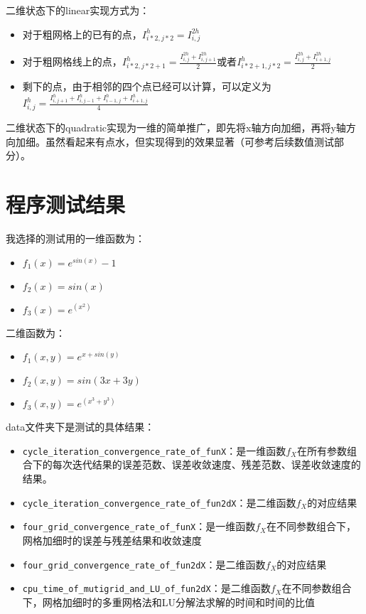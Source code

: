 \documentclass[12]{article}%
\begin{document}
二维状态下的linear实现方式为：
\begin{itemize}
    \item 对于粗网格上的已有的点，$I^h_{i*2,j*2}=I^{2h}_{i,j}$
    \item 对于粗网格线上的点，$I^h_{i*2,j*2+1}=\frac{I^{2h}_{i,j}+I^{2h}_{i,j+1}}{2}$或者$I^h_{i*2+1,j*2}=\frac{I^{2h}_{i,j}+I^{2h}_{i+1,j}}{2}$
    \item 剩下的点，由于相邻的四个点已经可以计算，可以定义为$I^h_{i,j}=\frac{I^h_{i,j+1}+I^h_{i,j-1}+I^h_{i-1,j}+I^h_{i+1,j}}{4}$
\end{itemize}

二维状态下的quadratic实现为一维的简单推广，即先将x轴方向加细，再将y轴方向加细。虽然看起来有点水，但实现得到的效果显著（可参考后续数值测试部分）。

\section{程序测试结果}
我选择的测试用的一维函数为：
\begin{itemize}
    \item $f_1(x)=e^{sin(x)}-1$
    \item $f_2(x)=sin(x)$
    \item $f_3(x)=e^(x^2)$
\end{itemize}
二维函数为：
\begin{itemize}
    \item $f_1(x,y)=e^{x+sin(y)}$
    \item $f_2(x,y)=sin(3x+3y)$
    \item $f_3(x,y)=e^(x^3+y^3)$
\end{itemize}

data文件夹下是测试的具体结果：
\begin{itemize}
    \item \verb|cycle_iteration_convergence_rate_of_funX|：是一维函数$f_X$在所有参数组合下的每次迭代结果的误差范数、误差收敛速度、残差范数、误差收敛速度的结果。
    \item \verb|cycle_iteration_convergence_rate_of_fun2dX|：是二维函数$f_X$的对应结果
    \item \verb|four_grid_convergence_rate_of_funX|：是一维函数$f_X$在不同参数组合下，网格加细时的误差与残差结果和收敛速度
    \item \verb|four_grid_convergence_rate_of_fun2dX|：是二维函数$f_X$的对应结果
    \item \verb|cpu_time_of_mutigrid_and_LU_of_fun2dX|：是二维函数$f_X$在不同参数组合下，网格加细时的多重网格法和LU分解法求解的时间和时间的比值
\end{itemize}
\end{document}
